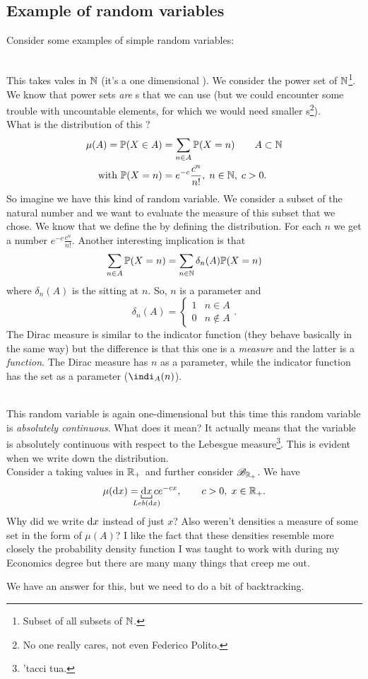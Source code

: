 \documentclass{report}
\begin{document}
\subsection{Example of random variables}
Consider some examples of simple random variables:
\begin{example}
	\\
	This \rv{} takes vales in $\mathbb{N}$ (it's a one dimensional \rv{}). We consider the power set of $\mathbb{N}$\footnote{Subset of all subsets of $\mathbb{N}$.}. We know that power sets \textit{are} \sa s that we can use (but we could encounter some trouble with uncountable elements, for which we would need smaller \sa s\footnote{No one really cares, not even Federico Polito.}).\\
	What is the distribution of this \rv{}?
	\begin{align*}
	\mu(A)=\mathbb{P}(X\in A)&=\sum_{n\in A}\mathbb{P}(X=n)\qquad A\subset\mathbb{N}\\
	\text{with } \mathbb{P}(X=n)&=e^{-c}\frac{c^n}{n!}, \;n\in\mathbb{N},\;c>0.
	\end{align*}
	So imagine we have this kind of random variable. We consider a subset of the natural number and we want to evaluate the measure of this subset that we chose. We know that we define the \rv{} by defining the distribution. For each $n$ we get a number $e^{-c}\frac{c^n}{n!}$. Another interesting implication is that \[\sum_{n\in A}\mathbb{P}(X=n)=\sum_{n\in\mathbb{N}}\delta_n(A)\mathbb{P}(X=n)\] where $\delta_n(A)$ is the  sitting at $n$. So, $n$ is a parameter and 
	\[\delta_n(A)=\begin{cases}
		1 &n\in A\\
		0 &n\not\in A
	\end{cases}.\] The Dirac measure is similar to the indicator function (they behave basically in the same way) but the difference is that this one is a \textit{measure} and the latter is a \textit{function}. The Dirac measure has $n$ as a parameter, while the indicator function has the set as a parameter ($\indi_A(n)$).
\end{example}
\begin{example}
	\\
	This random variable is again one-dimensional but this time this random variable is \textit{absolutely continuous}. What does it mean? It actually means that the variable is absolutely continuous with respect to the Lebesgue measure\footnote{'tacci tua.}. This is evident when we write down the distribution.\\
	Consider a \rv{} taking values in $\mathbb{R}_+$ and further consider $\mathscr{B}_{\mathbb{R}_+}$. We have
	\[\mu(\dif x)=\underbracket[0.6pt]{\dif x}_{\mathclap{Leb(\dif x)}}ce^{-cx},\qquad c>0,\;x\in\R_+.\] Why did we write $\mathop{}\!\mathrm{d} x$ instead of just $x$? Also weren't densities a measure of some set in the form of $\mu(A)$? I like the fact that these densities resemble more closely the probability density function I was taught to work with during my Economics degree but there are many many things that creep me out. \par
	We have an answer for this, but we need to do a bit of backtracking.
\end{example}
\end{document}
